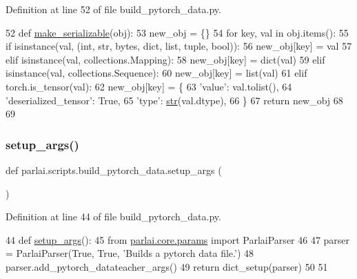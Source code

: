 Definition at line 52 of file build\+\_\+pytorch\+\_\+data.\+py.


\begin{DoxyCode}
52 \textcolor{keyword}{def }\hyperlink{namespaceparlai_1_1scripts_1_1build__pytorch__data_a1c8f4633b7dc8e990a3e1f6c3e92bd3f}{make\_serializable}(obj):
53     new\_obj = \{\}
54     \textcolor{keywordflow}{for} key, val \textcolor{keywordflow}{in} obj.items():
55         \textcolor{keywordflow}{if} isinstance(val, (int, str, bytes, dict, list, tuple, bool)):
56             new\_obj[key] = val
57         \textcolor{keywordflow}{elif} isinstance(val, collections.Mapping):
58             new\_obj[key] = dict(val)
59         \textcolor{keywordflow}{elif} isinstance(val, collections.Sequence):
60             new\_obj[key] = list(val)
61         \textcolor{keywordflow}{elif} torch.is\_tensor(val):
62             new\_obj[key] = \{
63                 \textcolor{stringliteral}{'value'}: val.tolist(),
64                 \textcolor{stringliteral}{'deserialized\_tensor'}: \textcolor{keyword}{True},
65                 \textcolor{stringliteral}{'type'}: \hyperlink{namespacegenerate__task__READMEs_a5b88452ffb87b78c8c85ececebafc09f}{str}(val.dtype),
66             \}
67     \textcolor{keywordflow}{return} new\_obj
68 
69 
\end{DoxyCode}
\mbox{\label{namespaceparlai_1_1scripts_1_1build__pytorch__data_afd88c85ffdbc233b56542e013352351a}} 
\subsubsection{\texorpdfstring{setup\+\_\+args()}{setup\_args()}}
{\footnotesize\ttfamily def parlai.\+scripts.\+build\+\_\+pytorch\+\_\+data.\+setup\+\_\+args (\begin{DoxyParamCaption}{ }\end{DoxyParamCaption})}



Definition at line 44 of file build\+\_\+pytorch\+\_\+data.\+py.


\begin{DoxyCode}
44 \textcolor{keyword}{def }\hyperlink{namespaceparlai_1_1scripts_1_1build__pytorch__data_afd88c85ffdbc233b56542e013352351a}{setup\_args}():
45     \textcolor{keyword}{from} \hyperlink{namespaceparlai_1_1core_1_1params}{parlai.core.params} \textcolor{keyword}{import} ParlaiParser
46 
47     parser = ParlaiParser(\textcolor{keyword}{True}, \textcolor{keyword}{True}, \textcolor{stringliteral}{'Builds a pytorch data file.'})
48     parser.add\_pytorch\_datateacher\_args()
49     \textcolor{keywordflow}{return} dict\_setup(parser)
50 
51 
\end{DoxyCode}
